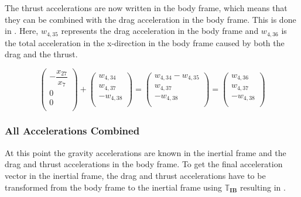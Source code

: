 \noindent
The thrust accelerations are now written in the body frame, which means that they can be combined with the drag acceleration in the body frame. This is done in . Here, $w_{4,35}$ represents the drag acceleration in the body frame and $w_{4,36}$ is the total acceleration in the x-direction in the body frame caused by both the drag and the thrust.


\begin{equation} \label{eq:DandTBody}
\begin{pmatrix}
-\dfrac{x_{27}}{x_{7}}\\
0\\
0\\
\end{pmatrix}
+
\begin{pmatrix}
w_{4,34}\\
w_{4,37}\\
-w_{4,38}\\
\end{pmatrix}
=
\begin{pmatrix}
w_{4,34}-w_{4,35}\\
w_{4,37}\\
-w_{4,38}\\
\end{pmatrix}
=
\begin{pmatrix}
w_{4,36}\\
w_{4,37}\\
-w_{4,38}\\
\end{pmatrix}
\end{equation}

\subsubsection{All Accelerations Combined}
\label{subsubsec:allAcc}
At this point the gravity accelerations are known in the inertial frame and the drag and thrust accelerations in the body frame. To get the final acceleration vector in the inertial frame, the drag and thrust accelerations have to be transformed from the body frame to the inertial frame using $\mathbb{T}_{\mathbf{IB}}$ resulting in .



